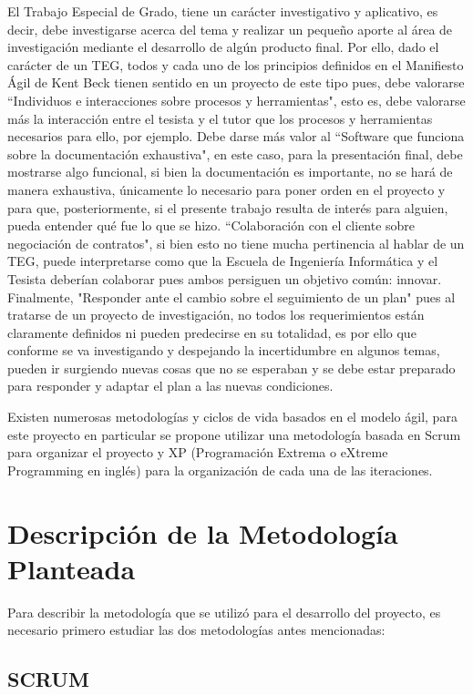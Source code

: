 El Trabajo Especial de Grado, tiene un carácter investigativo y aplicativo, es decir, debe investigarse acerca del tema y realizar un pequeño aporte al área de investigación mediante el desarrollo de algún producto final. Por ello, dado el carácter de un TEG, todos y cada uno de los principios definidos en el Manifiesto Ágil de Kent Beck tienen sentido en un proyecto de este tipo pues, debe valorarse ``Individuos e interacciones sobre procesos y herramientas", esto es, debe valorarse más la interacción entre el tesista y el tutor que los procesos y herramientas necesarios para ello, por ejemplo. Debe darse más valor al ``Software que funciona sobre la documentación exhaustiva", en este caso, para la presentación final, debe mostrarse algo funcional, si bien la documentación es importante, no se hará de manera exhaustiva, únicamente lo necesario para poner orden en el proyecto y para que, posteriormente, si el presente trabajo resulta de interés para alguien, pueda entender qué fue lo que se hizo. ``Colaboración con el cliente sobre negociación de contratos", si bien esto no tiene mucha pertinencia al hablar de un TEG, puede interpretarse como que la Escuela de Ingeniería Informática y el Tesista deberían colaborar pues ambos persiguen un objetivo común: innovar. Finalmente, "Responder ante el cambio sobre el seguimiento de un plan" pues al tratarse de un proyecto de investigación, no todos los requerimientos están claramente definidos ni pueden predecirse en su totalidad, es por ello que conforme se va investigando y despejando la incertidumbre en algunos temas, pueden ir surgiendo nuevas cosas que no se esperaban y se debe estar preparado para responder y adaptar el plan a las nuevas condiciones.

Existen numerosas metodologías y ciclos de vida basados en el modelo ágil, para este proyecto en particular se propone utilizar una metodología basada en Scrum para organizar el proyecto y XP (Programación Extrema o eXtreme Programming en inglés) para la organización de cada una de las iteraciones.

\section{Descripción de la Metodología Planteada}

Para describir la metodología que se utilizó para el desarrollo del proyecto, es necesario primero estudiar las dos metodologías antes mencionadas:

\subsection{SCRUM}

